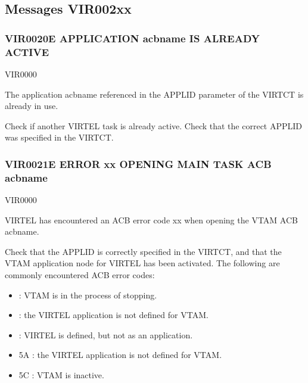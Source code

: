 \documentclass[letterpaper,10pt,english]{sphinxmanual}
\begin{document}
\subsection{Messages VIR002xx}
\label{\detokenize{messages:messages-vir002xx}}

\subsubsection{VIR0020E APPLICATION acbname IS ALREADY ACTIVE}
\label{\detokenize{messages:vir0020e-application-acbname-is-already-active}}\begin{description}
\sphinxAtStartPar
VIR0000

\sphinxAtStartPar
The application acbname referenced in the APPLID parameter of the VIRTCT is already in use.

\sphinxAtStartPar
Check if another VIRTEL task is already active. Check that the correct APPLID was specified in the VIRTCT.

\end{description}


\subsubsection{VIR0021E ERROR xx OPENING MAIN TASK ACB acbname}
\label{\detokenize{messages:vir0021e-error-xx-opening-main-task-acb-acbname}}\begin{description}
\sphinxAtStartPar
VIR0000

\sphinxAtStartPar
VIRTEL has encountered an ACB error code xx when opening the VTAM ACB acbname.

\sphinxAtStartPar
Check that the APPLID is correctly specified in the VIRTCT, and that the VTAM application node for VIRTEL has been activated. The following are commonly encountered ACB error codes:
\begin{itemize}
\item {} 
 : VTAM is in the process of stopping.

\item {} 
 : the VIRTEL application is not defined for VTAM.

\item {} 
 : VIRTEL is defined, but not as an application.

\item {} 
\sphinxAtStartPar
5A : the VIRTEL application is not defined for VTAM.

\item {} 
\sphinxAtStartPar
5C : VTAM is inactive.

\end{itemize}

\end{description}
\end{document}
